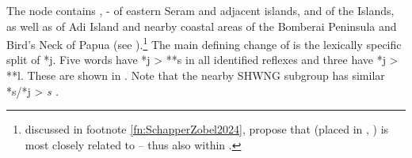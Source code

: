 \largerpage
{}
The  node contains ,
- of eastern Seram
and adjacent islands, 
and  of the  Islands,
as well as  of Adi Island
and nearby coastal areas of the Bomberai Peninsula
and Bird’s Neck of Papua (see ).\footnote{
		 discussed
		in footnote \ref{fn:SchapperZobel2024}, \citet{SchapperZobel2024b} propose that  (placed
		in , ) is most closely related to  -- thus also
		within .}
The main defining change of  is the lexically
specific split of *j.
Five words have *j > **s in all identified reflexes
and three have *j > **l.
These are shown in .
Note that the nearby SHWNG subgroup has similar *s/*j > \it{s} \citep[52f]{Kamholz2014}.

